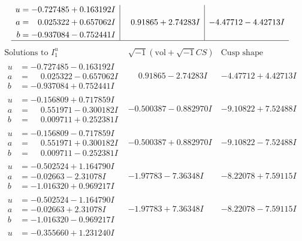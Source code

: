 \documentclass[1p]{elsarticle_modified}
\theoremstyle{definition}
\newcommand{\I}{\sqrt{-1}}
\begin{document}
$$\begin{array}{c|c|c}
\begin{aligned}
u &= -0.727485 + 0.163192 I \\
a &= \phantom{-}0.025322 + 0.657062 I \\
b &= -0.937084 - 0.752441 I\end{aligned}
 & \phantom{-}0.91865 + 2.74283 I & -4.47712 - 4.42713 I\\
 \hline 
 \end{array}$$\newpage$$\begin{array}{c|c|c}  
\text{Solutions to }I^u_{1}& \I (\text{vol} + \sqrt{-1}CS) & \text{Cusp shape}\\
 \hline 
\begin{aligned}
u &= -0.727485 - 0.163192 I \\
a &= \phantom{-}0.025322 - 0.657062 I \\
b &= -0.937084 + 0.752441 I\end{aligned}
 & \phantom{-}0.91865 - 2.74283 I & -4.47712 + 4.42713 I \\ \hline\begin{aligned}
u &= -0.156809 + 0.717859 I \\
a &= \phantom{-}0.551971 - 0.300182 I \\
b &= \phantom{-}0.009711 + 0.252381 I\end{aligned}
 & -0.500387 - 0.882970 I & -9.10822 + 7.52488 I \\ \hline\begin{aligned}
u &= -0.156809 - 0.717859 I \\
a &= \phantom{-}0.551971 + 0.300182 I \\
b &= \phantom{-}0.009711 - 0.252381 I\end{aligned}
 & -0.500387 + 0.882970 I & -9.10822 - 7.52488 I \\ \hline\begin{aligned}
u &= -0.502524 + 1.164790 I \\
a &= -0.02663 - 2.31078 I \\
b &= -1.016320 + 0.969217 I\end{aligned}
 & -1.97783 - 7.36348 I & -8.22078 + 7.59115 I \\ \hline\begin{aligned}
u &= -0.502524 - 1.164790 I \\
a &= -0.02663 + 2.31078 I \\
b &= -1.016320 - 0.969217 I\end{aligned}
 & -1.97783 + 7.36348 I & -8.22078 - 7.59115 I \\ \hline\begin{aligned}
u &= -0.355660 + 1.231240 I \\

\end{aligned}
\end{array}$$
\end{document}
